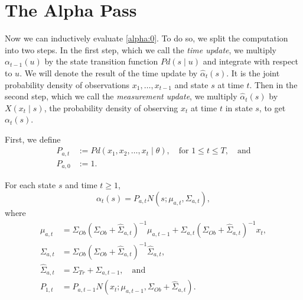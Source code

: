 \documentclass[12pt,leqno]{article}
\begin{document}
\section{The Alpha Pass}
  Now we can inductively evaluate \eqref{alpha:0}. To do so, we split the computation
  into two steps.  In the first step, which we call the {\em time update}, we multiply
  $\alpha_{t-1}(u)$ by the state transition function $Pd(s\mid u)$ and integrate with respect
  to $u$. We will denote the result of the time update by $\hat{\alpha}_t(s)$.  It is the joint probability
  density of observations $x_1,\dots,x_{t-1}$ and state $s$ at time $t$.
  Then in the second step, which we call the {\em measurement update}, we multiply
  $\hat{\alpha}_t(s)$ by $X(x_t \mid s)$, the probability density of observing $x_t$ at time $t$
  in state $s$, to get $\alpha_t(s)$.

  First, we define
\begin{align*}
  P_{a,t} &:= Pd(x_1,x_2,\dots,x_t \mid \theta),\quad\text{for $1\le t\le T$},\quad\text{and}\\
  P_{a,0} &:= 1.
\end{align*}

\begin{Thm}\label{alpha:1}
  For each state $s$ and time $t \ge 1$,
$$
  \alpha_t(s) = P_{a,t}N(s;\mu_{a,t},\Sigma_{a,t}),
$$
where
\begin{align*}
  \mu_{a,t} &= \Sigma_{Ob}(\Sigma_{Ob}+\widehat{\Sigma}_{a,t})^{-1}\mu_{a,t-1}
  + \widehat{\Sigma}_{a,t}(\Sigma_{Ob}+\widehat{\Sigma}_{a,t})^{-1}x_t, \\
  \Sigma_{a,t} &= \Sigma_{Ob}(\Sigma_{Ob}+\widehat{\Sigma}_{a,t})^{-1}\widehat{\Sigma}_{a,t},\\
  \widehat{\Sigma}_{a,t} &= \Sigma_{Tr}+\Sigma_{a,t-1},
 \quad\text{and}\\
  P_{1,t} &=P_{a,t-1}N(x_t;\mu_{a,t-1},\Sigma_{Ob} + \widehat{\Sigma}_{a,t}).
\end{align*}
\end{Thm}
\end{document}
